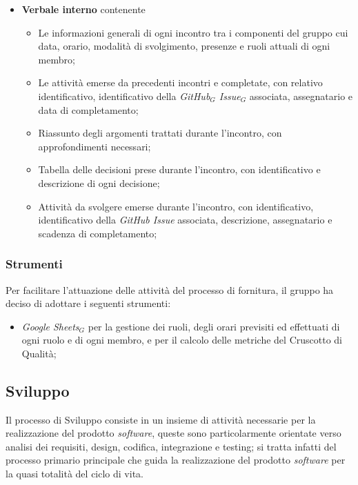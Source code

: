 \documentclass[10pt, letterpaper]{article}
\begin{document}
\begin{itemize}
    \item \textbf{Verbale interno} contenente
          \begin{itemize}
            \item Le informazioni generali di ogni incontro tra i componenti del gruppo cui data, orario, modalità di svolgimento, presenze e ruoli attuali di ogni membro;
            \item Le attività emerse da precedenti incontri e completate, con relativo identificativo, identificativo della \textit{GitHub$_{G}$ Issue$_{G}$} associata, assegnatario e data di completamento;
            \item Riassunto degli argomenti trattati durante l'incontro, con approfondimenti necessari;
            \item Tabella delle decisioni prese durante l'incontro, con identificativo e descrizione di ogni decisione;
            \item Attività da svolgere emerse durante l'incontro, con identificativo, identificativo della \textit{GitHub Issue} associata, descrizione, assegnatario e scadenza di completamento;
          \end{itemize}
\end{itemize}

\subsubsection{Strumenti}
Per facilitare l'attuazione delle attività del processo di fornitura, il gruppo ha deciso di adottare i seguenti strumenti: 
\begin{itemize}
    \item \textit{Google Sheets$_{G}$} per la gestione dei ruoli, degli orari previsiti ed effettuati di ogni ruolo e di ogni membro, e per il calcolo delle metriche del Cruscotto di Qualità;
\end{itemize}

\subsection{Sviluppo}
Il processo di Sviluppo consiste in un insieme di attività necessarie per la realizzazione del prodotto \textit{software}, queste sono particolarmente
orientate verso analisi dei requisiti, design, codifica, integrazione e testing; si tratta infatti del processo primario principale che
guida la realizzazione del prodotto \textit{software} per la quasi totalità del ciclo di vita.
\end{document}
